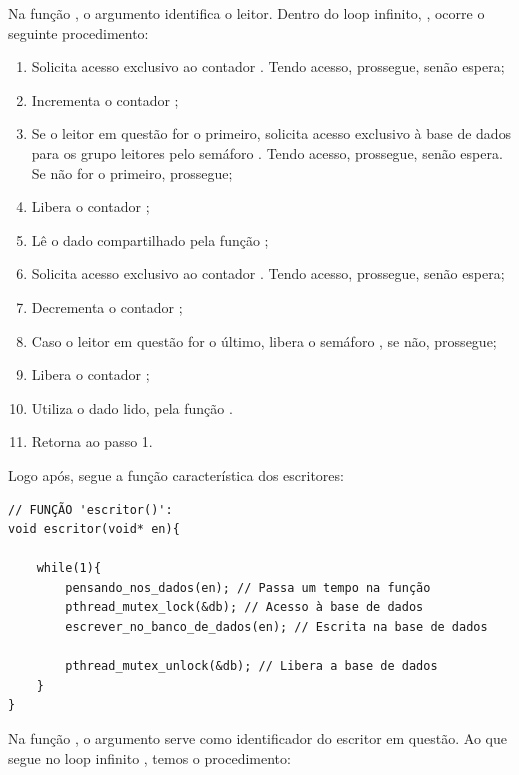 \documentclass[
	12pt,				%
	openright,			%
	oneside,			%
	a4paper,			%
	chapter=TITLE,		%
	english,			%
	french,				%
	spanish,			%
	brazil				%
	]{abntex2}
\theoremstyle{definition}
\begin{document}
Na função , o argumento  identifica o leitor. Dentro do loop infinito, , ocorre o seguinte procedimento:

\begin{enumerate}
    \item Solicita acesso exclusivo ao contador . Tendo acesso, prossegue, senão espera;
    \item Incrementa o contador ;
    \item Se o leitor em questão for o primeiro, solicita acesso exclusivo à base de dados para os grupo leitores pelo semáforo . Tendo acesso, prossegue, senão espera. Se não for o primeiro, prossegue;
    \item Libera o contador ;
    \item Lê o dado compartilhado pela função ;
    \item Solicita acesso exclusivo ao contador . Tendo acesso, prossegue, senão espera;
    \item Decrementa o contador ;
    \item Caso o leitor em questão for o último, libera o semáforo , se não, prossegue;
    \item Libera o contador ;
    \item Utiliza o dado lido, pela função .
    \item Retorna ao passo 1.
\end{enumerate}

Logo após, segue a função característica dos escritores:

\begin{verbatim}
// FUNÇÃO 'escritor()':    
void escritor(void* en){
    
    while(1){
        pensando_nos_dados(en); // Passa um tempo na função
        pthread_mutex_lock(&db); // Acesso à base de dados
        escrever_no_banco_de_dados(en); // Escrita na base de dados

        pthread_mutex_unlock(&db); // Libera a base de dados
    }
}
\end{verbatim}

Na função , o argumento  serve como identificador do escritor em questão. Ao que segue no loop infinito , temos o procedimento:
\end{document}
